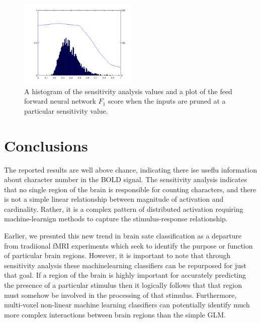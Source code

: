 \documentclass[twocolumn,final]{article}
\begin{document}
\begin{figure}[!htbp]
\centering
\includegraphics[width=0.5\textwidth]{figures/sensitivity-cutoff}
\caption{A histogram of the sensitivity analysis values and a plot of the feed forward neural network $F_1$ score when the inputs are pruned at a particular sensitivity value. }
\label{fig:sensitivity-cutoff}
\end{figure}

\section{Conclusions}
The reported results are well above chance, indicating there ise useflu information about character number in the BOLD signal.
The sensitivity analysis indicates that no single region of the brain is responsible for counting characters, and there is not a simple linear relationship between magnitude of activation and cardinality.
Rather, it is a complex pattern of distributed activation requiring machine-learnign methods to capture the stimulus-response relationship.

Earlier, we presnted this new trend in brain sate classification as a departure from tradiional fMRI experiments which seek to identify the purpose or function of particular brain regions.
However, it is important to note that through sensitivity analysis these machinelearning classifiers can be repurposed for just that goal.
If a region of the brain is highly important for accurately predicting the presence of a particular stimulus then it logically follows that that region must somehow be involved in the processing of that stimulus.
Furthermore, multi-voxel non-linear machine learning classifiers can potentially identify much more complex interactions between brain regions than the simple GLM.



\end{document}
